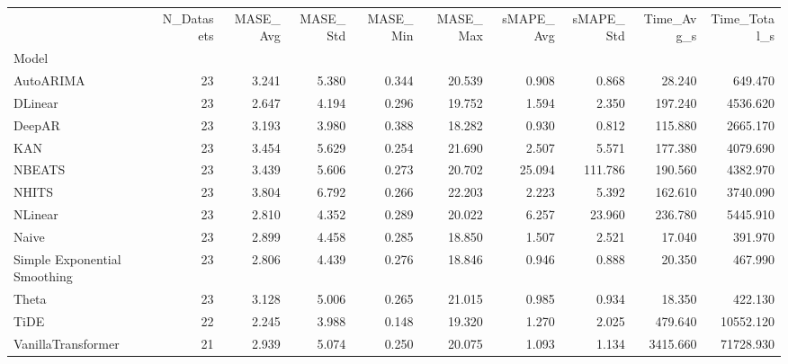 \begin{tabular}{lrrrrrrrrr}
\toprule
 & N_Datasets & MASE_Avg & MASE_Std & MASE_Min & MASE_Max & sMAPE_Avg & sMAPE_Std & Time_Avg_s & Time_Total_s \\
Model &  &  &  &  &  &  &  &  &  \\
\midrule
AutoARIMA & 23 & 3.241 & 5.380 & 0.344 & 20.539 & 0.908 & 0.868 & 28.240 & 649.470 \\
DLinear & 23 & 2.647 & 4.194 & 0.296 & 19.752 & 1.594 & 2.350 & 197.240 & 4536.620 \\
DeepAR & 23 & 3.193 & 3.980 & 0.388 & 18.282 & 0.930 & 0.812 & 115.880 & 2665.170 \\
KAN & 23 & 3.454 & 5.629 & 0.254 & 21.690 & 2.507 & 5.571 & 177.380 & 4079.690 \\
NBEATS & 23 & 3.439 & 5.606 & 0.273 & 20.702 & 25.094 & 111.786 & 190.560 & 4382.970 \\
NHITS & 23 & 3.804 & 6.792 & 0.266 & 22.203 & 2.223 & 5.392 & 162.610 & 3740.090 \\
NLinear & 23 & 2.810 & 4.352 & 0.289 & 20.022 & 6.257 & 23.960 & 236.780 & 5445.910 \\
Naive & 23 & 2.899 & 4.458 & 0.285 & 18.850 & 1.507 & 2.521 & 17.040 & 391.970 \\
Simple Exponential Smoothing & 23 & 2.806 & 4.439 & 0.276 & 18.846 & 0.946 & 0.888 & 20.350 & 467.990 \\
Theta & 23 & 3.128 & 5.006 & 0.265 & 21.015 & 0.985 & 0.934 & 18.350 & 422.130 \\
TiDE & 22 & 2.245 & 3.988 & 0.148 & 19.320 & 1.270 & 2.025 & 479.640 & 10552.120 \\
VanillaTransformer & 21 & 2.939 & 5.074 & 0.250 & 20.075 & 1.093 & 1.134 & 3415.660 & 71728.930 \\
\bottomrule
\end{tabular}